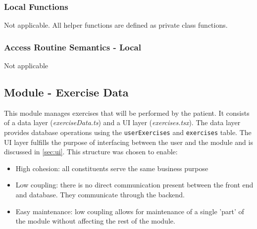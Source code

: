 \documentclass[12pt, titlepage]{article}
\begin{document}
\subsubsection{Local Functions}
Not applicable. All helper functions are defined as private class functions. 

\subsubsection{Access Routine Semantics - Local}
Not applicable

\subsection{Module - Exercise Data}

This module manages exercises that will be performed by the patient. It consists of a data layer (\textit{exerciseData.ts})
and a UI layer (\textit{exercises.tsx}). The data layer provides database operations using the \texttt{userExercises} and \texttt{exercises} table.
The UI layer fulfills the purpose of interfacing between the user and the module and is discussed in
\ref{sec:ui}. This structure was chosen to enable:
\begin{itemize}
    \item High cohesion: all constituents serve the same business purpose
    \item Low coupling: there is no direct communication present between the front end and database. They communicate through the backend.
    \item Easy maintenance: low coupling allows for maintenance of a single 'part' of the module without affecting the rest of the module. 
\end{itemize}
\end{document}
